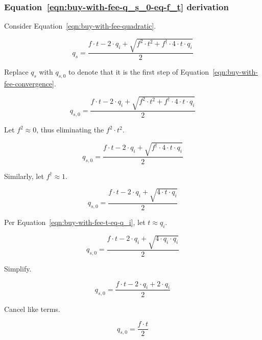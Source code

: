 \subsubsection{Equation~\ref{eqn:buy-with-fee-q_s_0-eq-f_t} derivation}%
\label{sssec:equation-eqn-buy-with-fee-q-s-0-eq-f-t-derivation}

Consider Equation~\ref{eqn:buy-with-fee-quadratic}.

\begin{equation*}
	q_s = \frac{f \cdot t - 2 \cdot q_i +
		\sqrt{f^2 \cdot t^2 + f^{\dagger} \cdot 4 \cdot t \cdot q_i}}{2}
\end{equation*}

Replace $q_s$ with $q_{s, 0}$ to denote that it is the first step of
Equation~\ref{eqn:buy-with-fee-convergence}.

\begin{equation*}
	q_{s, 0} = \frac{f \cdot t - 2 \cdot q_i +
		\sqrt{f^2 \cdot t^2 + f^{\dagger} \cdot 4 \cdot t \cdot q_i}}{2}
\end{equation*}

Let $f^2 \approx 0$, thus eliminating the $f^2 \cdot t^2$.

\begin{equation*}
	q_{s, 0} = \frac{f \cdot t - 2 \cdot q_i + \sqrt{f^{\dagger} \cdot 4 \cdot t \cdot q_i}}{2}
\end{equation*}

Similarly, let $f^{\dagger} \approx 1$.

\begin{equation*}
	q_{s, 0} = \frac{f \cdot t - 2 \cdot q_i + \sqrt{4 \cdot t \cdot q_i}}{2}
\end{equation*}

Per Equation~\ref{eqn:buy-with-fee-t-eq-q_i}, let $t \approx q_i$.

\begin{equation*}
	q_{s, 0} = \frac{f \cdot t - 2 \cdot q_i + \sqrt{4 \cdot q_i \cdot q_i}}{2}
\end{equation*}

Simplify.

\begin{equation*}
	q_{s, 0} = \frac{f \cdot t - 2 \cdot q_i + 2 \cdot q_i}{2}
\end{equation*}

Cancel like terms.

\begin{equation*}
	q_{s, 0} = \frac{f \cdot t}{2}
\end{equation*}

